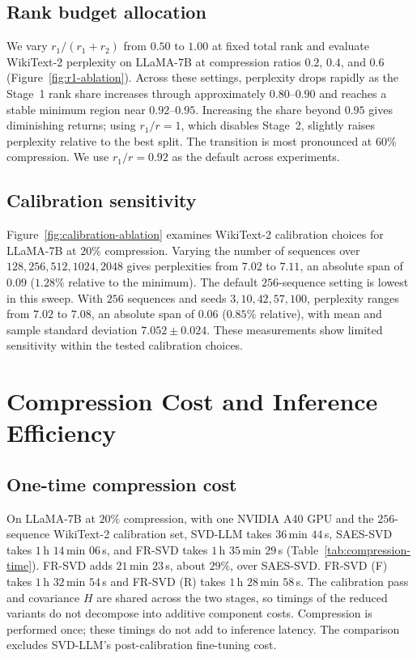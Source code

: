 

\subsection{Rank budget allocation}
We vary $r_1/(r_1+r_2)$ from $0.50$ to $1.00$ at fixed total rank and evaluate WikiText-2 perplexity on LLaMA-7B at compression ratios $0.2$, $0.4$, and $0.6$ (Figure~\ref{fig:r1-ablation}). Across these settings, perplexity drops rapidly as the Stage~1 rank share increases through approximately $0.80$--$0.90$ and reaches a stable minimum region near $0.92$--$0.95$. Increasing the share beyond $0.95$ gives diminishing returns; using $r_1/r=1$, which disables Stage~2, slightly raises perplexity relative to the best split. The transition is most pronounced at $60\%$ compression. We use $r_1/r=0.92$ as the default across experiments.



\subsection{Calibration sensitivity}
Figure~\ref{fig:calibration-ablation} examines WikiText-2 calibration choices for LLaMA-7B at $20\%$ compression. Varying the number of sequences over $128,256,512,1024,2048$ gives perplexities from $7.02$ to $7.11$, an absolute span of $0.09$ ($1.28\%$ relative to the minimum). The default $256$-sequence setting is lowest in this sweep. With $256$ sequences and seeds $3,10,42,57,100$, perplexity ranges from $7.02$ to $7.08$, an absolute span of $0.06$ ($0.85\%$ relative), with mean and sample standard deviation $7.052\pm0.024$. These measurements show limited sensitivity within the tested calibration choices.



\section{Compression Cost and Inference Efficiency}\label{app:efficiency}

\subsection{One-time compression cost}
On LLaMA-7B at $20\%$ compression, with one NVIDIA A40 GPU and the $256$-sequence WikiText-2 calibration set, SVD-LLM takes $36$\,min $44$\,s, SAES-SVD takes $1$\,h $14$\,min $06$\,s, and FR-SVD takes $1$\,h $35$\,min $29$\,s (Table~\ref{tab:compression-time}). FR-SVD adds $21$\,min $23$\,s, about $29\%$, over SAES-SVD. FR-SVD (F) takes $1$\,h $32$\,min $54$\,s and FR-SVD (R) takes $1$\,h $28$\,min $58$\,s. The calibration pass and covariance $H$ are shared across the two stages, so timings of the reduced variants do not decompose into additive component costs. Compression is performed once; these timings do not add to inference latency. The comparison excludes SVD-LLM's post-calibration fine-tuning cost.

